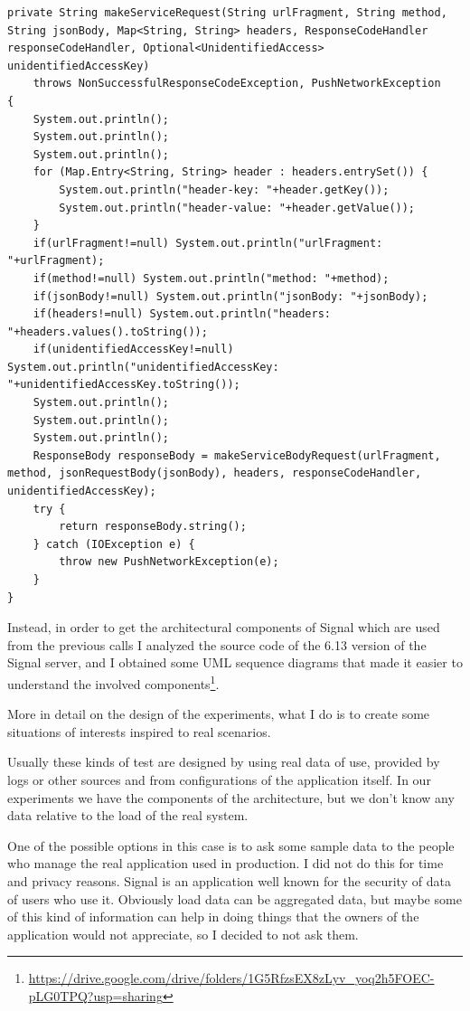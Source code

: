 \begin{verbatim}
private String makeServiceRequest(String urlFragment, String method, String jsonBody, Map<String, String> headers, ResponseCodeHandler responseCodeHandler, Optional<UnidentifiedAccess> unidentifiedAccessKey)
    throws NonSuccessfulResponseCodeException, PushNetworkException
{
    System.out.println();
    System.out.println();
    System.out.println();
    for (Map.Entry<String, String> header : headers.entrySet()) {
        System.out.println("header-key: "+header.getKey());
        System.out.println("header-value: "+header.getValue());
    }
    if(urlFragment!=null) System.out.println("urlFragment: "+urlFragment);
    if(method!=null) System.out.println("method: "+method);
    if(jsonBody!=null) System.out.println("jsonBody: "+jsonBody);
    if(headers!=null) System.out.println("headers: "+headers.values().toString());
    if(unidentifiedAccessKey!=null) System.out.println("unidentifiedAccessKey: "+unidentifiedAccessKey.toString());
    System.out.println();
    System.out.println();
    System.out.println();
    ResponseBody responseBody = makeServiceBodyRequest(urlFragment, method, jsonRequestBody(jsonBody), headers, responseCodeHandler, unidentifiedAccessKey);
    try {
        return responseBody.string();
    } catch (IOException e) {
        throw new PushNetworkException(e);
    }
}
\end{verbatim}



Instead, in order to get the architectural components of Signal which are used from the previous calls I analyzed the source code of the 6.13 version of the Signal server, and I obtained some UML sequence diagrams that made it easier to understand the involved components\footnote{\url{https://drive.google.com/drive/folders/1G5RfzsEX8zLyv_yoq2h5FOEC-pLG0TPQ?usp=sharing}}.

More in detail on the design of the experiments, what I do is to create some situations of interests inspired to real scenarios.

Usually these kinds of test are designed by using real data of use, provided by logs or other sources and from configurations of the application itself.
In our experiments we have the components of the architecture, but we don't know any data relative to the load of the real system.

One of the possible options in this case is to ask some sample data to the people who manage the real application used in production.
I did not do this for time and privacy reasons. Signal is an application well known for the security of data of users who use it.
Obviously load data can be aggregated data, but maybe some of this kind of information can help in doing things that the owners of the application would not appreciate, so I decided to not ask them.

